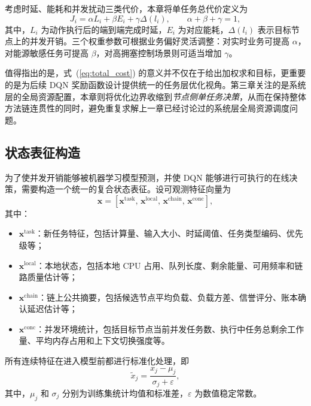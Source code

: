 考虑时延、能耗和并发扰动三类代价，本章将单任务总代价定义为
\begin{equation}
J_i = \alpha L_i + \beta E_i + \gamma \Delta(l_i), \qquad
\alpha + \beta + \gamma = 1,
\label{eq:total_cost}
\end{equation}
其中，$L_i$ 为动作执行后的端到端完成时延，$E_i$ 为对应能耗，$\Delta(l_i)$ 表示目标节点上的并发开销。三个权重参数可根据业务偏好灵活调整：对实时业务可提高 $\alpha$，对能源敏感任务可提高 $\beta$，对高拥塞控制场景则可适当增加 $\gamma$。

值得指出的是，式~(\ref{eq:total_cost}) 的意义并不仅在于给出加权求和目标，更重要的是为后续 DQN 奖励函数设计提供统一的任务层优化视角。第三章关注的是系统层的全局资源配置，本章则将优化边界收缩到\emph{节点侧单任务决策}，从而在保持整体方法链连贯性的同时，避免重复求解上一章已经讨论过的系统层全局资源调度问题。

\subsection{状态表征构造}

为了使并发开销能够被机器学习模型预测，并使 DQN 能够进行可执行的在线决策，需要构造一个统一的复合状态表征。设可观测特征向量为
\begin{equation}
\bm{x} = \left[ \bm{x}^{\mathrm{task}},\,
\bm{x}^{\mathrm{local}},\,
\bm{x}^{\mathrm{chain}},\,
\bm{x}^{\mathrm{conc}}
\right],
\label{eq:feature_vector}
\end{equation}
其中：
\begin{itemize}[leftmargin=2.5em]
    \item $\bm{x}^{\mathrm{task}}$：新任务特征，包括计算量、输入大小、时延阈值、任务类型编码、优先级等；
    \item $\bm{x}^{\mathrm{local}}$：本地状态，包括本地 CPU 占用、队列长度、剩余能量、可用频率和链路质量估计等；
    \item $\bm{x}^{\mathrm{chain}}$：链上公共摘要，包括候选节点平均负载、负载方差、信誉评分、账本确认延迟估计等；
    \item $\bm{x}^{\mathrm{conc}}$：并发环境统计，包括目标节点当前并发任务数、执行中任务总剩余工作量、平均内存占用和上下文切换强度等。
\end{itemize}

所有连续特征在进入模型前都进行标准化处理，即
\begin{equation}
\tilde{x}_j = \frac{x_j - \mu_j}{\sigma_j + \varepsilon},
\label{eq:normalize}
\end{equation}
其中，$\mu_j$ 和 $\sigma_j$ 分别为训练集统计均值和标准差，$\varepsilon$ 为数值稳定常数。

